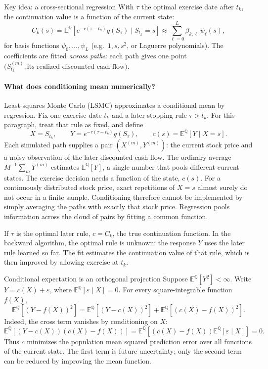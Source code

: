 \documentclass[10pt]{article}
\newcommand{\E}{\mathbb E}
\newcommand{\Q}{\mathbb Q}
\newcommand{\1}{\mathbf 1}
\theoremstyle{definition}
\begin{document}
\begin{keyidea}{Key idea: a cross-sectional regression}
With \(\tau\) the optimal exercise date after \(t_k\), the continuation value
is a function of the current state:
\[
C_k(s)=\E^\Q\!\left[e^{-r(\tau-t_k)}g(S_\tau)\mid S_{t_k}=s\right]
\approx\sum_{\ell=0}^L\beta_{k,\ell}\,\psi_\ell(s),
\]
for basis functions \(\psi_0,\ldots,\psi_L\) (e.g.\ \(1,s,s^2\), or Laguerre
polynomials). The coefficients are fitted \emph{across paths}: each path
gives one point \(\bigl(S^{(m)}_{t_k},\text{its realized discounted cash
flow}\bigr)\).
\end{keyidea}

\paragraph{What does conditioning mean numerically?}
Least-squares Monte Carlo (LSMC) approximates a conditional mean by regression.
Fix one exercise date \(t_k\) and a later stopping rule \(\tau>t_k\).
For this paragraph, treat that rule as fixed, and define
\[
X=S_{t_k},\qquad Y=e^{-r(\tau-t_k)}g(S_\tau),\qquad
c(s)=\E^\Q[Y\mid X=s].
\]
Each simulated path supplies a pair \((X^{(m)},Y^{(m)})\): the current
stock price and a noisy observation of the later discounted cash flow.
The ordinary average \(M^{-1}\sum_mY^{(m)}\) estimates \(\E^\Q[Y]\), a
single number that pools different current states. The exercise decision
needs a function of the state, \(c(s)\). For a continuously distributed
stock price, exact repetitions of \(X=s\) almost surely do not occur in a
finite sample. Conditioning therefore cannot be implemented by simply
averaging the paths with exactly that stock price. Regression pools
information across the cloud of pairs by fitting a common function.

If \(\tau\) is the optimal later rule, \(c=C_k\), the true continuation
function. In the backward algorithm, the optimal rule is unknown: the
response \(Y\) uses the later rule learned so far. The fit estimates the
continuation value of that rule, which is then improved by allowing
exercise at \(t_k\).

\begin{keyidea}{Conditional expectation is an orthogonal projection}
Suppose \(\E^\Q[Y^2]<\infty\). Write
\(Y=c(X)+\varepsilon\), where \(\E^\Q[\varepsilon\mid X]=0\).
For every square-integrable function \(f(X)\),
\[
\boxed{\E^\Q[(Y-f(X))^2]
=\E^\Q[(Y-c(X))^2]+\E^\Q[(c(X)-f(X))^2].}
\]
Indeed, the cross term vanishes by conditioning on \(X\):
\[
\E^\Q[(Y-c(X))(c(X)-f(X))]
=\E^\Q[(c(X)-f(X))\E^\Q[\varepsilon\mid X]]=0.
\]
Thus \(c\) minimizes the population mean squared prediction error over all
functions of the current state. The first term is future uncertainty;
only the second term can be reduced by improving the mean function.
\end{keyidea}
\end{document}
